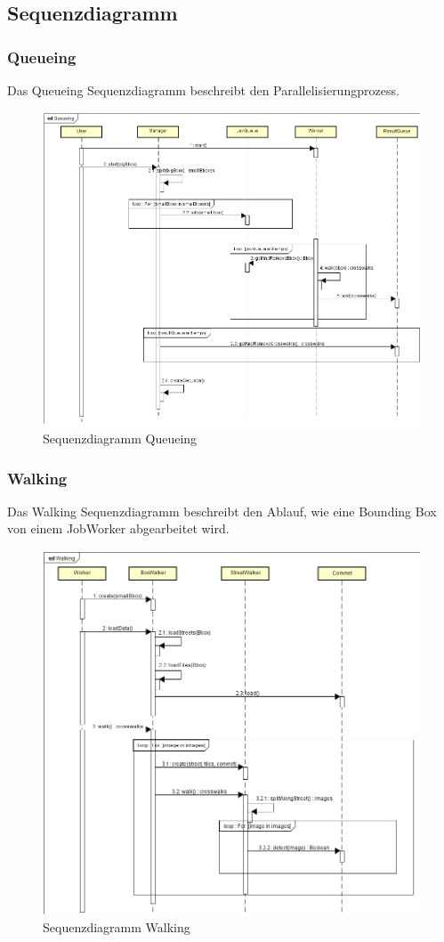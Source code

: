 \newpage
\subsection{Sequenzdiagramm}
\subsubsection{Queueing}
Das Queueing Sequenzdiagramm beschreibt den Parallelisierungprozess.
\begin{figure}[H]
	\includegraphics[width=\textwidth]{images/seq_queueing.png}
	\caption{Sequenzdiagramm Queueing}
\end{figure}

\newpage
\subsubsection{Walking}
Das Walking Sequenzdiagramm beschreibt den Ablauf, wie eine Bounding Box von einem JobWorker abgearbeitet wird.
\begin{figure}[H]
	\includegraphics[width=\textwidth]{images/seq_walking.png}
	\caption{Sequenzdiagramm Walking}
\end{figure}